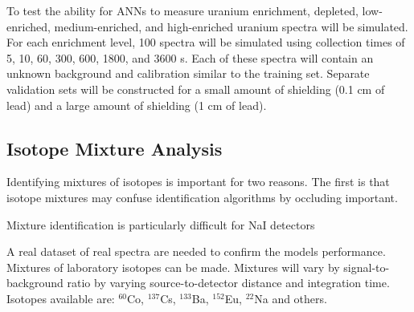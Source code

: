 \documentclass[tocnosub,noragright,centerchapter,12pt,fullpage]{uiucecethesis09}
\begin{document}
To test the ability for ANNs to measure uranium enrichment, depleted, low-enriched, medium-enriched, and high-enriched uranium spectra will be simulated. For each enrichment level, 100 spectra will be simulated using collection times of 5, 10, 60, 300, 600, 1800, and 3600 s. Each of these spectra will contain an unknown background and calibration similar to the training set. Separate validation sets will be constructed for a small amount of shielding (0.1 cm of lead) and a large amount of shielding (1 cm of lead). 





\iffalse
\subsection{Isotope Mixture Analysis}


Identifying mixtures of isotopes is important for two reasons. The first is that isotope mixtures may confuse identification algorithms by occluding important.

Mixture identification is particularly difficult for NaI detectors 

A real dataset of real spectra are needed to confirm the models performance. Mixtures of laboratory isotopes can be made. Mixtures will vary by signal-to-background ratio by varying source-to-detector distance and integration time. Isotopes available are: $^{60}$Co, $^{137}$Cs, $^{133}$Ba, $^{152}$Eu, $^{22}$Na and others. %
\end{document}
